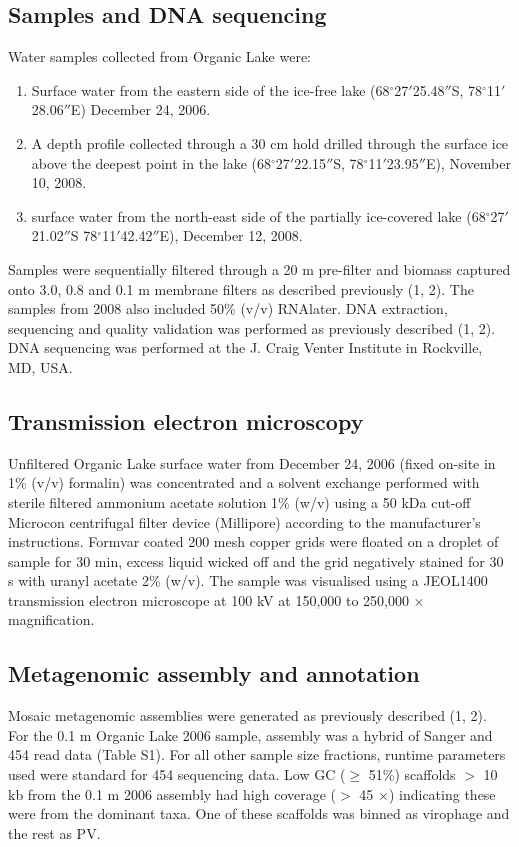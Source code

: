 \subsection{Samples and DNA sequencing}
Water samples collected from Organic Lake were: 

\begin{enumerate}
\item Surface water from the eastern side of the ice-free lake (68$^{\circ}$27$'$25.48$''$S, 78$^{\circ}$11$'$28.06$''$E) December 24, 2006.
\item A depth profile collected through a 30 cm hold drilled through the surface ice above the deepest point in the lake (68$^{\circ}$27$'$22.15$''$S, 78$^{\circ}$11$'$23.95$''$E), November 10, 2008. 
\item surface water from the north-east side of the partially ice-covered lake (68$^{\circ}$27$'$21.02$''$S 78$^{\circ}$11$'$42.42$''$E), December 12, 2008. 
\end{enumerate}

Samples were sequentially filtered through a 20 \textmu{}m pre-filter and biomass captured onto 3.0, 0.8 and 0.1 \textmu{}m membrane filters as described previously (1, 2). 
The samples from 2008 also included 50\% (v/v) RNAlater. 
DNA extraction, sequencing and quality validation was performed as previously described (1, 2). 
DNA sequencing was performed at the J. Craig Venter Institute in Rockville, MD, USA.  

\subsection{Transmission electron microscopy}
Unfiltered Organic Lake surface water from December 24, 2006 (fixed on-site in 1\% (v/v) formalin) was concentrated and a solvent exchange performed with sterile filtered ammonium acetate solution 1\% (w/v) using a 50 kDa cut-off Microcon centrifugal filter device (Millipore) according to the manufacturer’s instructions. 
Formvar coated 200 mesh copper grids were floated on a droplet of sample for 30 min, excess liquid wicked off and the grid negatively stained for 30 s with uranyl acetate 2\% (w/v). 
The sample was visualised using a JEOL1400 transmission electron microscope at 100 kV at 150,000 to 250,000 $\times$ magnification.

\subsection{Metagenomic assembly and annotation}
Mosaic metagenomic assemblies were generated as previously described (1, 2). 
For the 0.1 \textmu{}m Organic Lake 2006 sample, assembly was a hybrid of Sanger and 454 read data (Table S1). 
For all other sample size fractions, runtime parameters used were standard for 454 sequencing data. 
Low GC ($\ge$ 51\%) scaffolds $>$ 10 kb from the 0.1 \textmu{}m 2006 assembly had high coverage ($>$ 45 $\times$) indicating these were from the dominant taxa. 
One of these scaffolds was binned as virophage and the rest as PV. 

